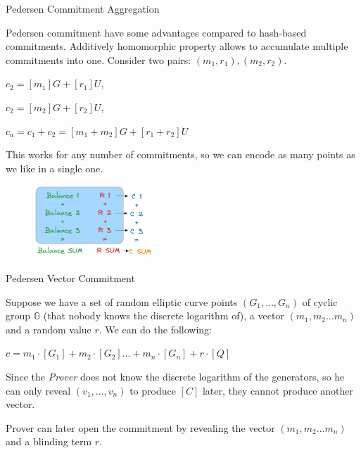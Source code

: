 \documentclass[xcolor={usenames,dvipsnames}]{beamer}
\begin{document}
    \begin{frame}{Pedersen Commitment Aggregation}

        Pedersen commitment have some advantages compared to hash-based commitments.
        Additively homomorphic property allows to accumulate multiple commitments into one.
        Consider two pairs: $(m_1, r_1), (m_2, r_2)$.
        
        \begin{center}
            $c_2 = [m_1]G + [r_1]U$,
        
            $c_2 = [m_2]G + [r_2]U$,
        
            $c_a = c_1 + c_2 = [m_1 + m_2]G + [r_1 + r_2]U$
        \end{center}
        
        This works for any number of commitments, so we can encode as many points as we like in a single one.

        \begin{figure}
            \centering
            \includegraphics[width=0.4\textwidth]{images/lecture_5/Balances.png}
        \end{figure}
        
\end{frame}

    \begin{frame}{Pedersen Vector Commitment}

        Suppose we have a set of random elliptic curve points $(G_1, \ldots ,G_n)$ of cyclic group $\mathbb{G}$ 
    (that nobody knows the discrete logarithm of), a vector $(m_1, m_2 \ldots m_n)$ and a random value $r$. We can do the following:

    \begin{center}
        $ c = m_1\cdot[G_1] + m_2 \cdot [G_2] \ldots + m_n \cdot [G_n] + r \cdot [Q]$ 
    \end{center}

    Since the \textit{Prover} does not know the discrete logarithm of the generators, so he can only reveal $(v_1, \ldots ,v_n)$ to produce $[C]$ later, they cannot produce another vector.

    Prover can later open the commitment by revealing the vector $(m_1, m_2 \ldots m_n)$ and a blinding term $r$.

            
    \end{frame}
\end{document}

